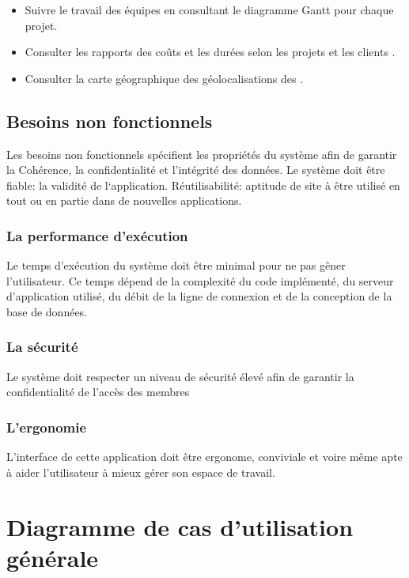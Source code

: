 \begin{itemize}
\item{ Suivre le travail des \'{e}quipes en consultant le diagramme Gantt pour chaque projet.}
\item{Consulter les rapports des co\^{u}ts et les dur\'{e}es selon les projets et les clients   .}
\item{Consulter la carte g\'{e}ographique des g\'{e}olocalisations des  .}
\end{itemize}

  \subsection{Besoins non fonctionnels}
Les besoins non fonctionnels sp\'{e}cifient les propri\'{e}t\'{e}s du syst\`{e}me afin de
garantir la Coh\'{e}rence, la confidentialit\'{e} et l'int\'{e}grit\'{e} des donn\'{e}es.
Le syst\`{e}me doit \^{e}tre fiable: la validit\'{e} de l`application.
R\'{e}utilisabilit\'{e}: aptitude de site \`{a} \^{e}tre utilis\'{e} en tout ou en partie dans de
nouvelles applications.

\subsubsection{La performance d'ex\'{e}cution}

Le temps d'ex\'{e}cution du syst\`{e}me doit \^{e}tre minimal pour ne pas g\^{e}ner
l'utilisateur. Ce temps d\'{e}pend de la complexit\'{e} du code impl\'{e}ment\'{e}, du
serveur d'application utilis\'{e}, du d\'{e}bit de la ligne de connexion et de la
conception de la base de donn\'{e}es.

\subsubsection{La s\'{e}curit\'{e}}

Le syst\`{e}me doit respecter un niveau de s\'{e}curit\'{e} \'{e}lev\'{e} afin de garantir la
confidentialit\'{e} de l'acc\`{e}s des membres

\subsubsection{L'ergonomie }

L'interface de cette application doit \^{e}tre ergonome, conviviale et voire m\^{e}me
apte \`{a} aider l'utilisateur \`{a} mieux g\'{e}rer son espace de travail.


\section{ Diagramme de cas d'utilisation g\'{e}n\'{e}rale }








